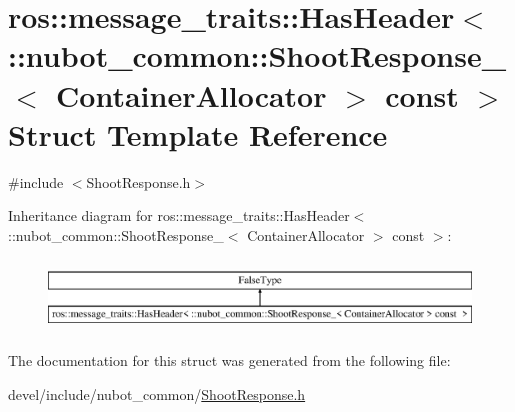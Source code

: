 \hypertarget{structros_1_1message__traits_1_1HasHeader_3_01_1_1nubot__common_1_1ShootResponse___3_01ContainerAllocator_01_4_01const_01_01_4}{\section{ros\-:\-:message\-\_\-traits\-:\-:Has\-Header$<$ \-:\-:nubot\-\_\-common\-:\-:Shoot\-Response\-\_\-$<$ Container\-Allocator $>$ const $>$ Struct Template Reference}
\label{structros_1_1message__traits_1_1HasHeader_3_01_1_1nubot__common_1_1ShootResponse___3_01ContainerAllocator_01_4_01const_01_01_4}
}


{\ttfamily \#include $<$Shoot\-Response.\-h$>$}

Inheritance diagram for ros\-:\-:message\-\_\-traits\-:\-:Has\-Header$<$ \-:\-:nubot\-\_\-common\-:\-:Shoot\-Response\-\_\-$<$ Container\-Allocator $>$ const $>$\-:\begin{figure}[H]
\begin{center}
\leavevmode
\includegraphics[height=1.927711cm]{structros_1_1message__traits_1_1HasHeader_3_01_1_1nubot__common_1_1ShootResponse___3_01ContainerAllocator_01_4_01const_01_01_4}
\end{center}
\end{figure}


The documentation for this struct was generated from the following file\-:\begin{DoxyCompactItemize}
\item 
devel/include/nubot\-\_\-common/\hyperlink{ShootResponse_8h}{Shoot\-Response.\-h}\end{DoxyCompactItemize}
